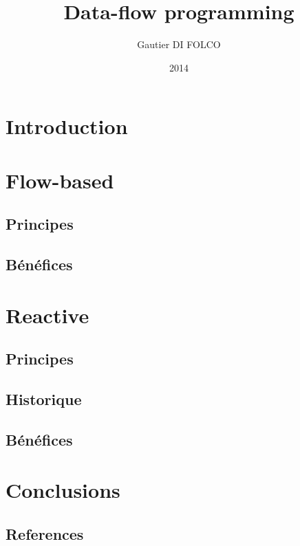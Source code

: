 \documentclass{article}
\title{Data-flow programming}
\author{Gautier DI FOLCO}
\date{2014}
\begin{document}
\maketitle

\section{Introduction}\label{introduction}


\section{Flow-based}\label{flow-based}

\subsection{Principes}\label{principes}


\subsection{Bénéfices}\label{bénéfices}


\section{Reactive}\label{reactive}

\subsection{Principes}\label{principes-1}


\subsection{Historique}\label{historique}


\subsection{Bénéfices}\label{bénéfices-1}


\section{Conclusions}\label{conclusions}


\begin{appendices}
\section{References}\label{references}


\end{appendices}
\end{document}
